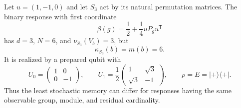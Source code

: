 \begin{proposition}
\label{prop:r73-decoder-obstruction}
Let $u=(1,-1,0)$ and let $S_3$ act by its natural permutation matrices. The
binary response with first coordinate
\begin{equation}\label{eq:r73-endpoint-response}
 \beta(g)=\frac12+\frac14 uP_gu^{\mathsf T}
\end{equation}
has $d=3$, $N=6$, and $\nu_{S_3}(V_b)=3$, but
\[
 \kappa_{S_3}(b)=m(b)=6.
\]
It is realized by a prepared qubit with
\[
 U_0=\begin{pmatrix}1&0\\0&-1\end{pmatrix},\qquad
 U_1=\frac12\begin{pmatrix}1&\sqrt3\\\sqrt3&-1\end{pmatrix},
 \qquad \rho=E=|+\rangle\langle+|.
\]
Thus the least stochastic memory can differ for responses having the same
observable group, module, and residual cardinality.
\end{proposition}
